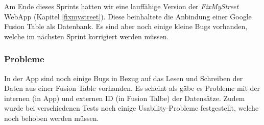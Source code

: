 Am Ende dieses Sprints hatten wir eine lauffähige Version der \emph{FixMyStreet} \gls{WebApp} (Kapitel \ref{fixmystreet}). Diese beinhaltete die Anbindung einer Google Fusion Table als Datenbank. Es sind aber noch einige kleine Bugs vorhanden, welche im nächsten Sprint korrigiert werden müssen.

\subsubsection{Probleme}
In der App sind noch einige Bugs in Bezug auf das Lesen und Schreiben der Daten aus einer Fusion Table vorhanden. Es scheint als gäbe es Probleme mit der internen (in App) und externen ID (in Fusion Talbe) der Datensätze. Zudem wurde bei verschiedenen Tests noch einige Usability-Probleme festgestellt, welche noch behoben werden müssen.
